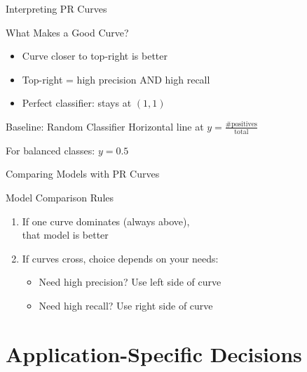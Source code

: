 \documentclass{beamer}
\begin{document}
\begin{frame}{Interpreting PR Curves}
\begin{keypointsbox}{What Makes a Good Curve?}
\begin{itemize}
    \item Curve closer to top-right is better
    \item Top-right = high precision AND high recall
    \item Perfect classifier: stays at $(1, 1)$
\end{itemize}
\end{keypointsbox}

\vspace{0.3cm}

\begin{block}{Baseline: Random Classifier}
Horizontal line at $y = \frac{\text{\# positives}}{\text{total}}$

\vspace{0.2cm}

For balanced classes: $y = 0.5$
\end{block}
\end{frame}

\begin{frame}{Comparing Models with PR Curves}
\begin{alertblock}{Model Comparison Rules}
\begin{enumerate}
    \item If one curve dominates (always above), \\
          that model is better
    \item If curves cross, choice depends on your needs:
    \begin{itemize}
        \item Need high precision? Use left side of curve
        \item Need high recall? Use right side of curve
    \end{itemize}
\end{enumerate}
\end{alertblock}
\end{frame}

\section{Application-Specific Decisions}
\end{document}
